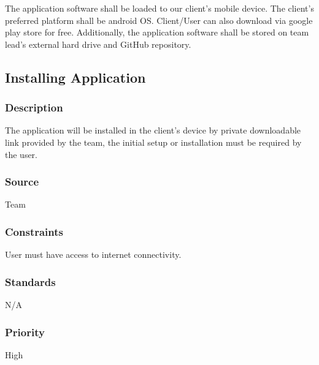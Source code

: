The application software shall be loaded to our client's mobile device. The client's preferred platform shall be android OS. Client/User can also download via google play store for free. Additionally, the application software shall be stored on team lead's external hard drive and GitHub repository.  

\subsection{Installing Application}
\subsubsection{Description}
The application will be installed in the client's device by private downloadable link provided by the team, the initial setup or installation must be required by the user.   
\subsubsection{Source}
Team
\subsubsection{Constraints}
User must have access to internet connectivity. 
\subsubsection{Standards}
N/A
\subsubsection{Priority}
High